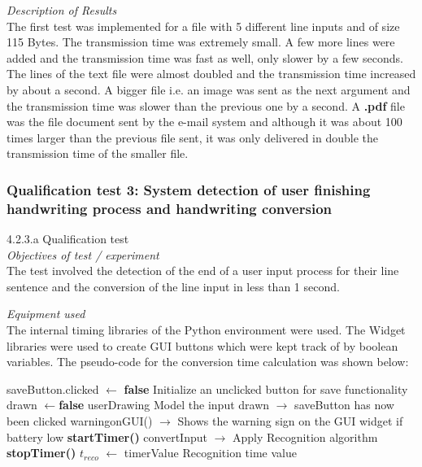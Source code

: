 \textit{Description of Results}\\
The first test was implemented for a file with 5 different line inputs and of size 115 Bytes. The transmission time was extremely small. A few more lines were added and the transmission time was fast as well, only slower by a few seconds. The lines of the text file were almost doubled and the transmission time increased by about a second. A bigger file i.e. an image was sent as the next argument and the transmission time was slower than the previous one by a second. A \textbf{.pdf} file was the file document sent by the e-mail system and although it was about 100 times larger than the previous file sent, it was only delivered in double the transmission time of the smaller file.

\subsubsection{Qualification test 3: System detection of user finishing handwriting process and handwriting conversion}

4.2.3.a Qualification test\\
\textit{Objectives of test / experiment}\\
The test involved the detection of the end of a user input process for their line sentence and the conversion of the line input in less than 1 second.

\textit{Equipment used}\\
The internal timing libraries of the Python environment were used. The Widget libraries were used to create GUI buttons which were kept track of by boolean variables. The pseudo-code for the conversion time calculation was shown below:\\

\begin{algorithmic}
	\STATE saveButton.clicked $\leftarrow$ \textbf{false} \hfill Initialize an unclicked button for save functionality  
	\STATE drawn $\leftarrow$\textbf{false} userDrawing \hfill Model the input drawn
	\ENDWHILE
	\STATE $\rightarrow$ saveButton has now been clicked
	\STATE warningonGUI() \hfill $\rightarrow$ Shows the warning sign on the GUI widget if battery low
	\ENDIF
	\STATE \textbf{startTimer()}
	\STATE convertInput \hfill $\rightarrow$ Apply Recognition algorithm
	\STATE \textbf{stopTimer()}
	\STATE $t_{reco}$ $\leftarrow$ timerValue	\hfill Recognition time value
\end{algorithmic}

